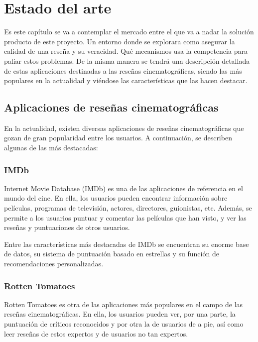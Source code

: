 \chapter{Estado del arte}

Es este capítulo se va a contemplar el mercado entre el que va a nadar la solución producto de este proyecto. Un entorno donde se explorara como asegurar la calidad de una reseña y su veracidad. Qué mecanismos usa la competencia para paliar estos problemas. De la misma manera se tendrá una descripción detallada de estas aplicaciones destinadas a las reseñas cinematográficas, siendo las más populares en la actualidad y viéndose las características que las hacen destacar.

\section{Aplicaciones de reseñas cinematográficas}

En la actualidad, existen diversas aplicaciones de reseñas cinematográficas que gozan de gran 
popularidad entre los usuarios. A continuación, se describen algunas de las más destacadas:

\subsection{IMDb}

Internet Movie Database (IMDb) es una de las aplicaciones de referencia en el mundo del cine. En ella, 
los usuarios pueden encontrar información sobre películas, programas de televisión, actores, 
directores, guionistas, etc. Además, se permite a los usuarios puntuar y comentar las películas que han 
visto, y ver las reseñas y puntuaciones de otros usuarios.

Entre las características más destacadas de IMDb se encuentran su enorme base de datos, su sistema de 
puntuación basado en estrellas y su función de recomendaciones personalizadas.

\subsection{Rotten Tomatoes}

Rotten Tomatoes es otra de las aplicaciones más populares en el campo de las reseñas cinematográficas. 
En ella, los usuarios pueden ver, por una parte, la puntuación de críticos reconocidos y por otra la de usuarios de a 
pie, así como leer reseñas de estos expertos y de usuarios no tan expertos.

